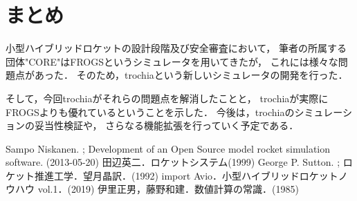 \documentclass[a4j,10pt]{jsarticle}
\begin{document}
\section{まとめ}

小型ハイブリッドロケットの設計段階及び安全審査において，
筆者の所属する団体"CORE"はFROGSというシミュレータを用いてきたが，
これには様々な問題点があった．
そのため，trochiaという新しいシミュレータの開発を行った．

そして，今回trochiaがそれらの問題点を解消したことと，
trochiaが実際にFROGSよりも優れているということを示した．
今後は，trochiaのシミュレーションの妥当性検証や，
さらなる機能拡張を行っていく予定である．

% 
% 

\begin{thebibliography}{99}
		Sampo Niskanen. ; Development of an Open Source model rocket simulation software. (2013-05-20)
		田辺英二．ロケットシステム(1999)
		George P. Sutton. ; ロケット推進工学．望月晶訳．(1992)
		import Avio．小型ハイブリッドロケットノウハウ vol.1．(2019)
		伊里正男，藤野和建．数値計算の常識．(1985)
\end{thebibliography}
\end{document}
